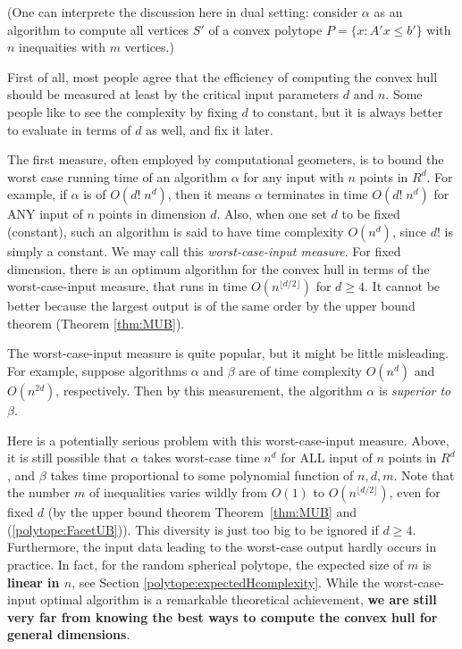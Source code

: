 \documentclass[a4paper,12pt]{article}
\begin{document}
(One can interprete the discussion here
in dual setting: consider $\alpha$ as an algorithm to compute
all vertices $S'$ of a convex polytope $P=\{x : A' x \le b' \}$
with $n$ inequaities with $m$ vertices.)

First of all, most people agree that the efficiency of 
computing the convex hull 
should be measured at least by the critical
input parameters $d$ and $n$.  Some people
like to see the complexity by fixing $d$ to
constant, but it is always better to evaluate
in terms of $d$ as well, and fix it later.

The first measure, often employed by computational geometers, is
to bound the worst case running time of an algorithm $\alpha$ for any
input with $n$ points in $R^d$.  For example, if $\alpha$ is of
$O(d! \; n^d)$, then it means $\alpha$ terminates in time 
$O(d! \; n^d)$ for ANY input of $n$ points in dimension $d$.
Also, when one set $d$ to be fixed (constant), such an algorithm
is said to have time complexity $O(n^d)$, since $d!$ is simply
a constant.   We may call this {\em worst-case-input measure}.
For fixed dimension, 
there is an optimum algorithm \cite{c-ochaa-93} for the convex hull in terms of 
the worst-case-input measure, that runs in time $O(n^{\lfloor d/2 \rfloor})$
for $d\ge 4$.
It  cannot be better because the largest output is of
the same order by the upper bound theorem (Theorem \ref{thm:MUB}).

The worst-case-input measure
is quite popular, but it might be little misleading.  
For example, suppose algorithms $\alpha$ and $\beta$ are of time complexity
$O(n^d)$ and $O(n^{2d})$, respectively.  Then by this measurement, 
the algorithm $\alpha$ is {\em superior to\/} $\beta$.  

Here is a potentially serious problem with this worst-case-input measure.
Above, it is still possible that $\alpha$ takes worst-case time $n^d$ for
ALL input of $n$ points in $R^d$, and $\beta$ takes time proportional
to some polynomial function of $n, d, m$.   
Note that the number $m$ of inequalities varies
wildly from $O(1)$ to $O(n^{\lfloor d/2 \rfloor})$, even for fixed $d$
(by the upper bound theorem Theorem~\ref{thm:MUB} and (\ref{polytope:FacetUB})).  This diversity is just too big to be ignored
if $d \ge 4$.
Furthermore, the input data leading to the worst-case output
hardly occurs in practice.  In fact, for the random spherical polytope,
the expected size of $m$ is {\bf linear in $n$}, see Section 
\ref{polytope:expectedHcomplexity}.
While the worst-case-input optimal
algorithm \cite{c-ochaa-93} is a remarkable theoretical achievement,
{\bf we are still very far from knowing the best ways 
to compute the convex hull for general dimensions}.
\end{document}
